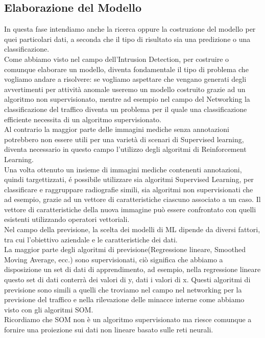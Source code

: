 \documentclass[../tesi.tex]{subfiles}
\begin{document}
\subsection{Elaborazione del Modello}
In questa fase intendiamo anche la ricerca oppure la costruzione del modello per quei particolari dati, a seconda che il tipo di risultato sia una predizione o una classificazione.\\
Come abbiamo visto nel campo dell’Intrusion Detection, per costruire o comunque elaborare un modello, diventa fondamentale il tipo di problema che vogliamo andare a risolvere:
se vogliamo aspettare che vengano generati degli avvertimenti per attività anomale useremo un modello costruito grazie ad un algoritmo non supervisionato, mentre ad esempio nel campo del Networking la classificazione del traffico diventa un problema per il quale una classificazione efficiente necessita di un algoritmo supervisionato.\\
Al contrario la maggior parte delle immagini mediche senza annotazioni potrebbero non essere utili per una varietà di scenari di Supervised learning, diventa necessario in questo campo l'utilizzo degli algoritmi di Reinforcement Learning.\\
Una volta ottenuto un insieme di immagini mediche contenenti annotazioni, quindi targettizzati, é possibile utilizzare sia algoritmi Supervised Learning, per classificare e raggruppare radiografie simili, sia algoritmi non supervisionati che ad esempio, grazie ad un vettore di caratteristiche ciascuno associato a un caso. Il vettore di caratteristiche della nuova immagine può essere confrontato con quelli esistenti utilizzando operatori vettoriali.\\
Nel campo della previsione, la scelta dei modelli di ML dipende da diversi fattori, tra cui l’obiettivo aziendale e le caratteristiche dei dati.\\
La maggior parte degli algoritmi di previsione(Regressione lineare, Smoothed Moving Average, ecc.) sono supervisionati, ciò significa che abbiamo a disposizione un set di dati di apprendimento, ad esempio, nella regressione lineare questo set di dati conterrà dei valori di y, dati i valori di x. Questi algoritmi di previsione sono simili a quelli che troviamo nel campo nel networking per la previsione del traffico e nella rilevazione delle minacce interne come abbiamo visto con gli algoritmi SOM.\\
Ricordiamo che SOM non è un algoritmo supervisionato ma riesce comunque a fornire una proiezione sui dati non lineare basato sulle reti neurali.
\newpage
\end{document}
